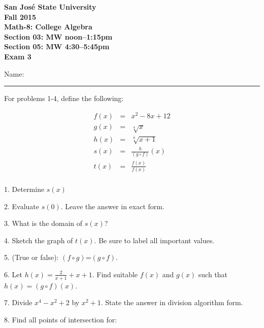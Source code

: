 \documentclass[letterpaper, 12pt]{article}
\begin{document}
\begin{center}
\bfseries
San Jos\'{e} State University \\
Fall 2015 \\
Math-8: College Algebra \\
Section 03: MW noon--1:15pm \\
Section 05: MW 4:30--5:45pm \\
\bigskip
Exam 3
\end{center}

\vspace{0.5in}

Name: \rule{5in}{1pt}

\vspace{0.5in}

For problems 1-4, define the following:

\begin{eqnarray*}
f(x) &=& x^2-8x+12 \\
g(x) &=& \sqrt[4]{x} \\
h(x) &=& \sqrt[9]{x+1} \\
s(x) &=& \frac{h}{(g\circ f)}(x) \\
t(x) &=& \frac{f(x)}{f(x)} \\
\end{eqnarray*}

1. Determine $s(x)$

\vspace{2in}

2. Evaluate $s(0)$. Leave the answer in exact form.

\newpage

3. What is the domain of $s(x)$?

\vspace{4in}

4. Sketch the graph of $t(x)$. Be sure to label all important values.

\vspace{2in}

5. (True or false): $(f\circ g)$=$(g\circ f)$.

\vspace{0.5in}

6. Let $h(x)=\frac{2}{x+1}+x+1$. Find suitable $f(x)$ and $g(x)$ such that
$h(x)=(g\circ f)(x)$.

\newpage

7. Divide $x^4-x^2+2$ by $x^2+1$. State the answer in division algorithm form.

\vspace{4in}

8. Find all points of intersection for:
\end{document}
